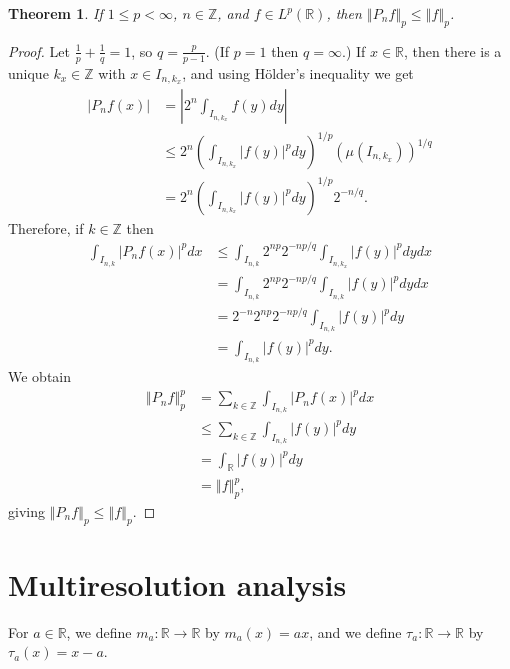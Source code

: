 \documentclass{article}
\newcommand{\norm}[1]{\left\Vert #1 \right\Vert}
\newtheorem{theorem}{Theorem}
\theoremstyle{definition}
\begin{document}
\begin{theorem}
If $1 \leq p < \infty$, $n \in \mathbb{Z}$, and $f \in L^p(\mathbb{R})$, then $\norm{P_nf}_p
\leq \norm{f}_p$.
\end{theorem}
\begin{proof}
Let $\frac{1}{p}+\frac{1}{q}=1$, so $q=\frac{p}{p-1}$.  (If $p=1$ then $q=\infty$.)
If $x \in \mathbb{R}$, then there is a unique  $k_x \in \mathbb{Z}$ with $x \in I_{n,k_x}$, and  using H\"older's inequality we get
\begin{align*}
|P_n f(x)|& = \left| 2^n \int_{I_{n,k_x}} f(y) dy \right| \\
&\leq 2^n \left(  \int_{I_{n,k_x}} |f(y)|^p dy \right)^{1/p} (\mu(I_{n,k_x}))^{1/q}\\
&=2^n \left(  \int_{I_{n,k_x}} |f(y)|^p dy \right)^{1/p} 2^{-n/q}.
\end{align*}
Therefore, if $k \in \mathbb{Z}$ then
\begin{align*}
\int_{I_{n,k}} |P_nf(x)|^p dx&\leq \int_{I_{n,k}}  2^{np} 2^{-np/q}  \int_{I_{n,k_x}} |f(y)|^p dydx\\
&= \int_{I_{n,k}}  2^{np} 2^{-np/q}  \int_{I_{n,k}} |f(y)|^p dydx\\
&=2^{-n}  2^{np} 2^{-np/q}\int_{I_{n,k}} |f(y)|^p dy\\
&=\int_{I_{n,k}} |f(y)|^p dy.
\end{align*}
We obtain
\begin{align*}
\norm{P_nf}_p^p&=\sum_{k \in \mathbb{Z}} \int_{I_{n,k}} |P_nf(x)|^p dx\\
&\leq\sum_{k \in \mathbb{Z}} \int_{I_{n,k}} |f(y)|^p dy\\
&=\int_{\mathbb{R}}  |f(y)|^p dy\\
&=\norm{f}_p^p,
\end{align*}
giving $\norm{P_nf}_p \leq \norm{f}_p$.
\end{proof}



\section{Multiresolution analysis}
For $a \in \mathbb{R}$, we define $m_a:\mathbb{R} \to \mathbb{R}$ by $m_a(x)=ax$,
and we define $\tau_a:\mathbb{R} \to \mathbb{R}$ by $\tau_a(x)=x-a$.
\end{document}
